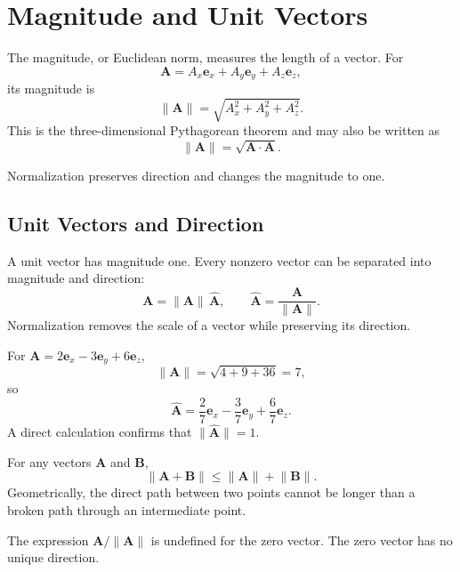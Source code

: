 \section{Magnitude and Unit Vectors}
\label{sec:magnitude-unit}

The magnitude, or Euclidean norm, measures the length of a vector. For
\[
\mathbf A=A_x\mathbf e_x+A_y\mathbf e_y+A_z\mathbf e_z,
\]
its magnitude is
\[
\boxed{\lVert\mathbf A\rVert=\sqrt{A_x^2+A_y^2+A_z^2}}.
\]
This is the three-dimensional Pythagorean theorem and may also be written as
\[
\lVert\mathbf A\rVert=\sqrt{\mathbf A\cdot\mathbf A}.
\]

\begin{bookfigure}{Normalization preserves direction and changes the magnitude to one.}

\label{fig:unit-vector-geometry}
\end{bookfigure}

\subsection{Unit Vectors and Direction}

A unit vector has magnitude one. Every nonzero vector can be separated into magnitude and direction:
\[
\mathbf A=\lVert\mathbf A\rVert\,\widehat{\mathbf A},
\qquad
\widehat{\mathbf A}=\frac{\mathbf A}{\lVert\mathbf A\rVert}.
\]
Normalization removes the scale of a vector while preserving its direction.

\begin{workedexample}
For $\mathbf A=2\mathbf e_x-3\mathbf e_y+6\mathbf e_z$,
\[
\lVert\mathbf A\rVert=\sqrt{4+9+36}=7,
\]
so
\[
\widehat{\mathbf A}=\frac{2}{7}\mathbf e_x-\frac{3}{7}\mathbf e_y+\frac{6}{7}\mathbf e_z.
\]
A direct calculation confirms that $\lVert\widehat{\mathbf A}\rVert=1$.
\end{workedexample}

\begin{propertybox}
For any vectors $\mathbf A$ and $\mathbf B$,
\[
\lVert\mathbf A+\mathbf B\rVert\leq \lVert\mathbf A\rVert+\lVert\mathbf B\rVert.
\]
Geometrically, the direct path between two points cannot be longer than a broken path through an intermediate point.
\end{propertybox}

\begin{warningbox}
The expression $\mathbf A/\lVert\mathbf A\rVert$ is undefined for the zero vector. The zero vector has no unique direction.
\end{warningbox}
